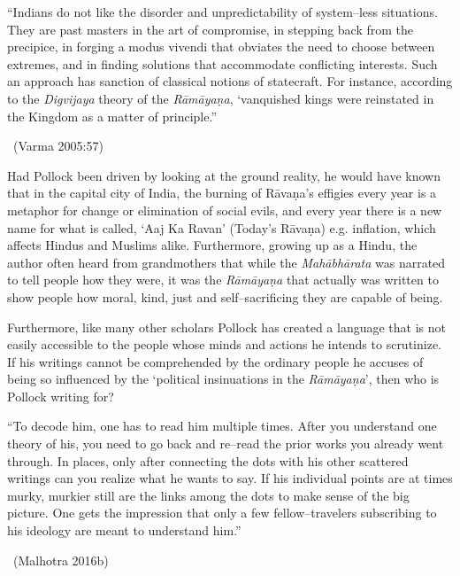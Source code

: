 \begin{myquote}
“Indians do not like the disorder and unpredictability of system–less situations. They are past masters in the art of compromise, in stepping back from the precipice, in forging a modus vivendi that obviates the need to choose between extremes, and in finding solutions that accommodate conflicting interests. Such an approach has sanction of classical notions of statecraft. For instance, according to the \textit{Digvijaya} theory of the \textit{Rāmāyaṇa}, ‘vanquished kings were reinstated in the Kingdom as a matter of principle.” 

~\hfill (Varma 2005:57)
\end{myquote}

Had Pollock been driven by looking at the ground reality, he would have known that in the capital city of India, the burning of Rāvaṇa’s effigies every year is a metaphor for change or elimination of social evils, and every year there is a new name for what is called, ‘Aaj Ka Ravan’ (Today’s Rāvaṇa) e.g. inflation, which affects Hindus and Muslims alike. Furthermore, growing up as a Hindu, the author often heard from grandmothers that while the \textit{Mahābhārata} was narrated to tell people how they were, it was the \textit{Rāmāyaṇa} that actually was written to show people how moral, kind, just and self–sacrificing they are capable of being.

Furthermore, like many other scholars Pollock has created a language that is not easily accessible to the people whose minds and actions he intends to scrutinize. If his writings cannot be comprehended by the ordinary people he accuses of being so influenced by the ‘political insinuations in the \textit{Rāmāyaṇa}’, then who is Pollock writing for?

\begin{myquote}
“To decode him, one has to read him multiple times. After you understand one theory of his, you need to go back and re–read the prior works you already went through. In places, only after connecting the dots with his other scattered writings can you realize what he wants to say. If his individual points are at times murky, murkier still are the links among the dots to make sense of the big picture. One gets the impression that only a few fellow–travelers subscribing to his ideology are meant to understand him.” 

~\hfill (Malhotra 2016b)
\end{myquote}

